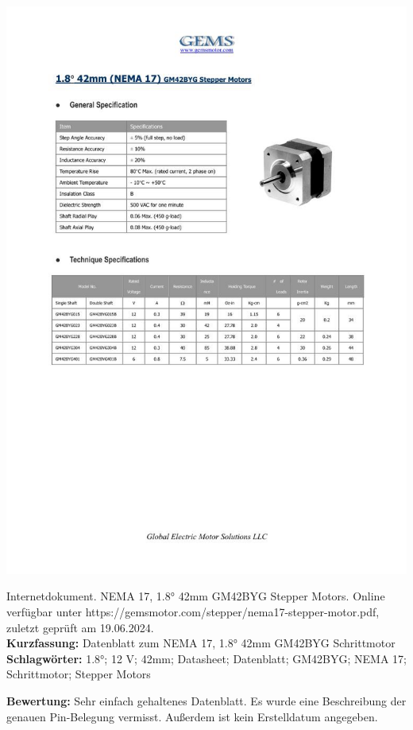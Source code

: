 {
\begin{minipage}{0.38\textwidth}
	\includegraphics[width=\linewidth]{images/Gems.jpg}
\end{minipage}
\hfill
\begin{minipage}{0.6\textwidth}
Internetdokument. NEMA 17, 1.8° 42mm GM42BYG Stepper Motors. Online verfügbar unter https://gemsmotor.com/stepper/nema17-stepper-motor.pdf, zuletzt geprüft am 19.06.2024.
\\ \textbf{Kurzfassung:}
Datenblatt zum NEMA 17, 1.8° 42mm GM42BYG Schrittmotor
\\ \textbf{Schlagwörter:}
1.8°; 12 V; 42mm; Datasheet; Datenblatt; GM42BYG; NEMA 17; Schrittmotor; Stepper Motors
\end{minipage}
\textbf{Bewertung:}
Sehr einfach gehaltenes Datenblatt. Es wurde eine Beschreibung der genauen  Pin-Belegung vermisst. Außerdem ist kein Erstelldatum angegeben.
}

